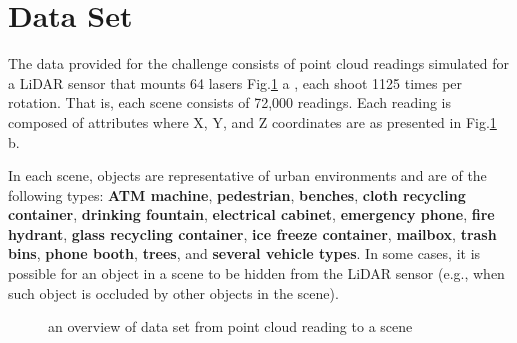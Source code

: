 \section{Data Set}

The data provided for the challenge consists of point cloud readings simulated for a LiDAR sensor that mounts 64 lasers Fig.\ref{fig:data_overview} a , each shoot 1125 times per rotation. That is, each scene consists of 72,000 readings. Each reading is composed of attributes where X, Y, and Z coordinates are as presented in Fig.\ref{fig:data_overview} b.

In each scene, objects are representative of urban environments and are of the following types: \textbf{ATM machine}, \textbf{pedestrian}, \textbf{benches}, \textbf{cloth recycling container}, \textbf{drinking fountain}, \textbf{electrical cabinet}, \textbf{emergency phone}, \textbf{fire hydrant}, \textbf{glass recycling container}, \textbf{ice freeze container}, \textbf{mailbox}, \textbf{trash bins}, \textbf{phone booth}, \textbf{trees}, and \textbf{several vehicle types}. In some cases, it is possible for an object in a scene to be hidden from the LiDAR sensor (e.g., when such object is occluded by other objects in the scene)\cite{DEBSGC2019}.
\begin{figure}%
	\centering
	\qquad
	\caption{ an overview of data set from point cloud reading to a scene}%
	\label{fig:data_overview}%
\end{figure}






